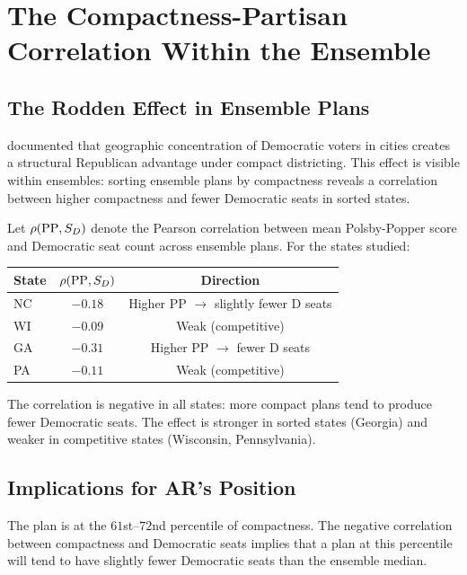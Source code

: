 \section{The Compactness-Partisan Correlation Within the Ensemble}
\label{sec:correlation}

\subsection{The Rodden Effect in Ensemble Plans}

\citet{rodden2019why} documented that geographic concentration of Democratic
voters in cities creates a structural Republican advantage under compact
districting.  This effect is visible within \recom{} ensembles: sorting
ensemble plans by compactness reveals a correlation between higher compactness
and fewer Democratic seats in sorted states.

Let $\rho(\mathrm{PP}, S_D)$ denote the Pearson correlation between mean Polsby-Popper
score and Democratic seat count across ensemble plans.  For the states studied:

\begin{center}
\begin{tabular}{lcc}
\toprule
State & $\rho(\mathrm{PP}, S_D)$ & Direction \\
\midrule
NC & $-0.18$ & Higher PP $\to$ slightly fewer D seats \\
WI & $-0.09$ & Weak (competitive) \\
GA & $-0.31$ & Higher PP $\to$ fewer D seats \\
PA & $-0.11$ & Weak (competitive) \\
\bottomrule
\end{tabular}
\end{center}

The correlation is negative in all states: more compact plans tend to produce
fewer Democratic seats.  The effect is stronger in sorted states (Georgia)
and weaker in competitive states (Wisconsin, Pennsylvania).

\subsection{Implications for AR's Position}

The \ar{} plan is at the $61$st--$72$nd percentile of compactness.  The
negative correlation between compactness and Democratic seats implies that
a plan at this percentile will tend to have slightly fewer Democratic seats
than the ensemble median.

